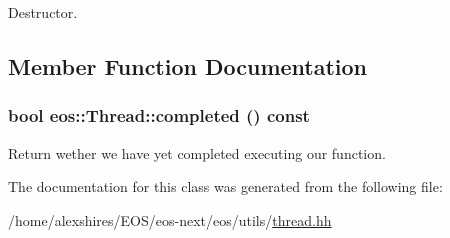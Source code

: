 Destructor. 

\subsection{Member Function Documentation}
\hypertarget{classeos_1_1Thread_a4badce4c44db821aaffa5ce06ad1f697}{
\subsubsection[{completed}]{\setlength{\rightskip}{0pt plus 5cm}bool eos::Thread::completed () const}}
\label{classeos_1_1Thread_a4badce4c44db821aaffa5ce06ad1f697}


Return wether we have yet completed executing our function. 

The documentation for this class was generated from the following file:\begin{DoxyCompactItemize}
\item 
/home/alexshires/EOS/eos-\/next/eos/utils/\hyperlink{thread_8hh}{thread.hh}\end{DoxyCompactItemize}
